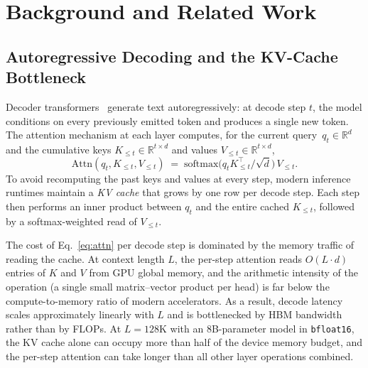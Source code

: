 \chapter{Background and Related Work}\label{chap:background}


\section{Autoregressive Decoding and the KV-Cache Bottleneck}\label{sec:kv-bottleneck}

Decoder transformers~\cite{vaswani2017attention} generate text
autoregressively: at decode step $t$, the model conditions on every
previously emitted token and produces a single new token.  The
attention mechanism at each layer computes, for the current
query~$q_t \in \mathbb{R}^{d}$ and the cumulative keys
$K_{\le t} \in \mathbb{R}^{t \times d}$ and values
$V_{\le t} \in \mathbb{R}^{t \times d}$,
\begin{equation}\label{eq:attn}
  \mathrm{Attn}(q_t, K_{\le t}, V_{\le t})
  \;=\;
  \mathrm{softmax}\!\bigl(q_t K_{\le t}^{\top} / \sqrt{d}\bigr)\,V_{\le t}.
\end{equation}
To avoid recomputing the past keys and values at every step, modern
inference runtimes maintain a \emph{KV cache} that grows by one row
per decode step.  Each step then performs an inner product between
$q_t$ and the entire cached $K_{\le t}$, followed by a softmax-weighted
read of $V_{\le t}$.

The cost of Eq.~\eqref{eq:attn} per decode step is dominated by the
memory traffic of reading the cache.  At context length $L$, the per-step
attention reads $O(L \cdot d)$ entries of $K$ and $V$ from GPU global
memory, and the arithmetic intensity of the operation (a single small
matrix--vector product per head) is far below the compute-to-memory
ratio of modern accelerators.  As a result, decode latency scales
approximately linearly with $L$ and is bottlenecked by HBM bandwidth
rather than by FLOPs.  At $L = 128$K with an 8B-parameter model in
\texttt{bfloat16}, the KV cache alone can occupy more than half of the
device memory budget, and the per-step attention can take longer than
all other layer operations combined.

